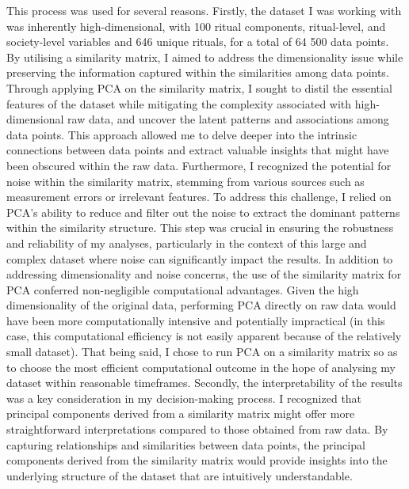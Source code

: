 \documentclass[12pt]{report}
\begin{document}
\noindent This process was used for several reasons. Firstly, the dataset I was working with was inherently high-dimensional, with 100 ritual components, ritual-level, and society-level variables and 646 unique rituals, for a total of 64 500 data points. By utilising a similarity matrix, I aimed to address the dimensionality issue while preserving the information captured within the similarities among data points. Through applying PCA on the similarity matrix, I sought to distil the essential features of the dataset while mitigating the complexity associated with high-dimensional raw data, and uncover the latent patterns and associations among data points. This approach allowed me to delve deeper into the intrinsic connections between data points and extract valuable insights that might have been obscured within the raw data. Furthermore, I recognized the potential for noise within the similarity matrix, stemming from various sources such as measurement errors or irrelevant features. To address this challenge, I relied on PCA's ability to reduce and filter out the noise to extract the dominant patterns within the similarity structure. This step was crucial in ensuring the robustness and reliability of my analyses, particularly in the context of this large and complex dataset where noise can significantly impact the results. In addition to addressing dimensionality and noise concerns, the use of the similarity matrix for PCA conferred non-negligible computational advantages. Given the high dimensionality of the original data, performing PCA directly on raw data would have been more computationally intensive and potentially impractical (in this case, this computational efficiency is not easily apparent because of the relatively small dataset). That being said, I chose to run PCA on a similarity matrix so as to choose the most efficient computational outcome in the hope of analysing my dataset within reasonable timeframes. Secondly, the interpretability of the results was a key consideration in my decision-making process. I recognized that principal components derived from a similarity matrix might offer more straightforward interpretations compared to those obtained from raw data. By capturing relationships and similarities between data points, the principal components derived from the similarity matrix would provide insights into the underlying structure of the dataset that are intuitively understandable.\\
\\
\end{document}
